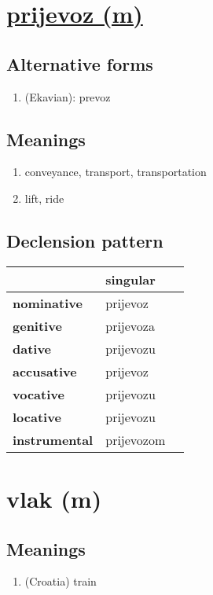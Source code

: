 \filbreak
\section{\underline{prijevoz (m)}}
\subsection*{Alternative forms}
\begin{enumerate}
\item (Ekavian): prevoz
\end{enumerate}
\subsection*{Meanings}
\begin{enumerate}
\item conveyance, transport, transportation
\item lift, ride
\end{enumerate}
\subsection*{Declension pattern}
\begin{tabularx}{\linewidth}{Xll}
\toprule
{} &    singular \\
\midrule
\textbf{nominative  } &    prijevoz \\
\textbf{genitive    } &   prijevoza \\
\textbf{dative      } &   prijevozu \\
\textbf{accusative  } &    prijevoz \\
\textbf{vocative    } &   prijevozu \\
\textbf{locative    } &   prijevozu \\
\textbf{instrumental} &  prijevozom \\
\bottomrule
\end{tabularx}

\filbreak
\section{vlak (m)}
\subsection*{Meanings}
\begin{enumerate}
\item (Croatia) train
\end{enumerate}
